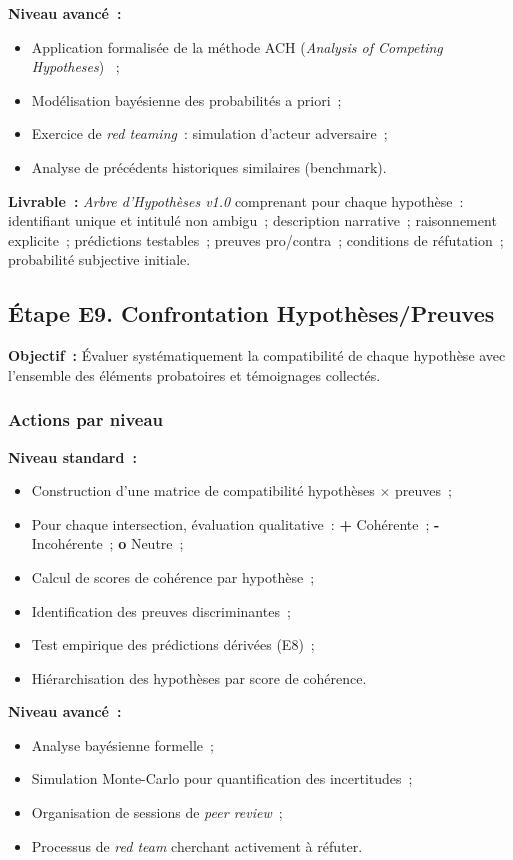 \textbf{Niveau avancé~:}
\begin{itemize}
    \item Application formalisée de la méthode ACH
          (\textit{Analysis of Competing Hypotheses}) \cite{heuer1999}~;
    \item Modélisation bayésienne des probabilités a priori~;
    \item Exercice de \textit{red teaming}~: simulation d'acteur adversaire~;
    \item Analyse de précédents historiques similaires (benchmark).
\end{itemize}

\textbf{Livrable~:} \textit{Arbre d'Hypothèses v1.0} comprenant pour chaque
hypothèse~: identifiant unique et intitulé non ambigu~; description narrative~;
raisonnement explicite~; prédictions testables~; preuves pro/contra~;
conditions de réfutation~; probabilité subjective initiale.

\subsection{Étape E9. Confrontation Hypothèses/Preuves}

\textbf{Objectif~:} Évaluer systématiquement la compatibilité de chaque hypothèse
avec l'ensemble des éléments probatoires et témoignages collectés.

\subsubsection*{Actions par niveau}

\textbf{Niveau standard~:}
\begin{itemize}
    \item Construction d'une matrice de compatibilité hypothèses $\times$ preuves~;
    \item Pour chaque intersection, évaluation qualitative~:
          \textbf{+} Cohérente~; \textbf{-} Incohérente~; \textbf{o} Neutre~;
    \item Calcul de scores de cohérence par hypothèse~;
    \item Identification des preuves discriminantes~;
    \item Test empirique des prédictions dérivées (E8)~;
    \item Hiérarchisation des hypothèses par score de cohérence.
\end{itemize}

\textbf{Niveau avancé~:}
\begin{itemize}
    \item Analyse bayésienne formelle~;
    \item Simulation Monte-Carlo pour quantification des incertitudes~;
    \item Organisation de sessions de \textit{peer review}~;
    \item Processus de \textit{red team} cherchant activement à réfuter.
\end{itemize}

